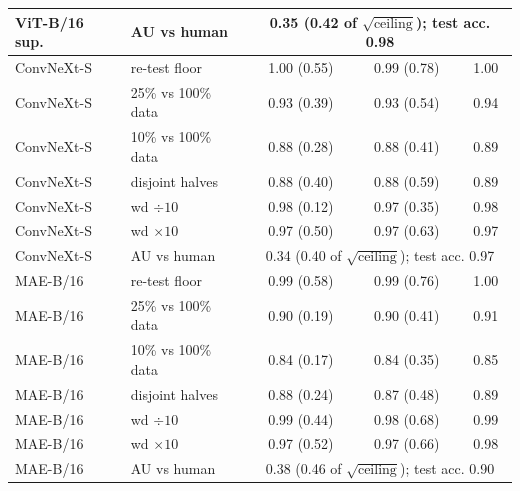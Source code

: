 \begin{table}[h]
\begin{tabular}{llccc}
ViT-B/16 sup. & AU vs human & \multicolumn{3}{c}{0.35 (0.42 of $\sqrt{\text{ceiling}}$); test acc. 0.98} \\ \midrule
ConvNeXt-S & re-test floor & 1.00 (0.55) & 0.99 (0.78) & 1.00 \\
ConvNeXt-S & 25\% vs 100\% data & 0.93 (0.39) & 0.93 (0.54) & 0.94 \\
ConvNeXt-S & 10\% vs 100\% data & 0.88 (0.28) & 0.88 (0.41) & 0.89 \\
ConvNeXt-S & disjoint halves & 0.88 (0.40) & 0.88 (0.59) & 0.89 \\
ConvNeXt-S & wd $\div10$ & 0.98 (0.12) & 0.97 (0.35) & 0.98 \\
ConvNeXt-S & wd $\times10$ & 0.97 (0.50) & 0.97 (0.63) & 0.97 \\
ConvNeXt-S & AU vs human & \multicolumn{3}{c}{0.34 (0.40 of $\sqrt{\text{ceiling}}$); test acc. 0.97} \\ \midrule
MAE-B/16 & re-test floor & 0.99 (0.58) & 0.99 (0.76) & 1.00 \\
MAE-B/16 & 25\% vs 100\% data & 0.90 (0.19) & 0.90 (0.41) & 0.91 \\
MAE-B/16 & 10\% vs 100\% data & 0.84 (0.17) & 0.84 (0.35) & 0.85 \\
MAE-B/16 & disjoint halves & 0.88 (0.24) & 0.87 (0.48) & 0.89 \\
MAE-B/16 & wd $\div10$ & 0.99 (0.44) & 0.98 (0.68) & 0.99 \\
MAE-B/16 & wd $\times10$ & 0.97 (0.52) & 0.97 (0.66) & 0.98 \\
MAE-B/16 & AU vs human & \multicolumn{3}{c}{0.38 (0.46 of $\sqrt{\text{ceiling}}$); test acc. 0.90} \\
\bottomrule
\end{tabular}
\end{table}